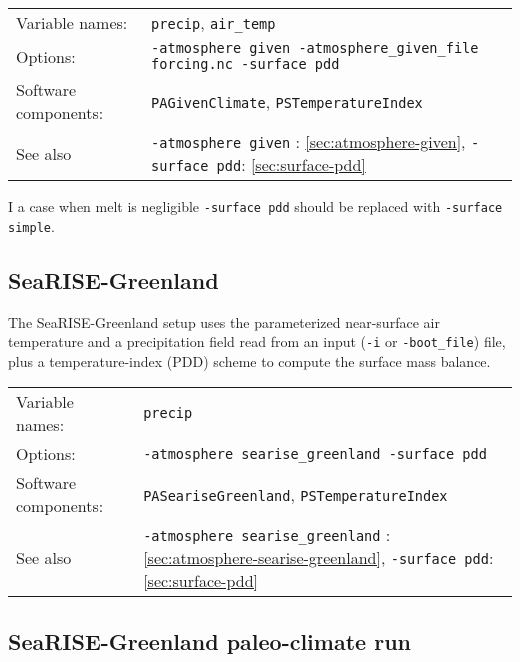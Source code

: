 \documentclass[titlepage,letterpaper,final]{scrartcl}
\begin{document}
\begin{center}
  \begin{tabular}{lp{}}
    \toprule
    Variable names: & \texttt{precip}, \texttt{air_temp} \\
    Options: & \texttt{-atmosphere given -atmosphere_given_file forcing.nc -surface~pdd} \\
    Software components: & \texttt{PAGivenClimate}, \texttt{PSTemperatureIndex} \\
    See also & \texttt{-atmosphere given} : \ref{sec:atmosphere-given},
    \texttt{-surface pdd}: \ref{sec:surface-pdd} \\
    \bottomrule
  \end{tabular}
\end{center}

I a case when melt is  negligible \texttt{-surface pdd} should be replaced with
\texttt{-surface simple}.

\subsection{SeaRISE-Greenland}
\label{sec:use-case-searise-greenland}

The SeaRISE-Greenland setup uses the parameterized near-surface air temperature
\cite{Faustoetal2009} and a precipitation field read from an input (\texttt{-i}
or \texttt{-boot_file}) file, plus  a temperature-index (PDD) scheme to compute
the surface mass balance.

\begin{center}
  \begin{tabular}{lp{}}
    \toprule
    Variable names: & \texttt{precip} \\
    Options: & \texttt{-atmosphere searise_greenland -surface~pdd} \\
    Software components: & \texttt{PASeariseGreenland}, \texttt{PSTemperatureIndex} \\
    See also & \texttt{-atmosphere searise_greenland} : \ref{sec:atmosphere-searise-greenland},
    \texttt{-surface pdd}: \ref{sec:surface-pdd} \\
    \bottomrule
  \end{tabular}
\end{center}

\subsection{SeaRISE-Greenland paleo-climate run}
\label{sec:use-case-searise-greenland-paleo}
\end{document}
